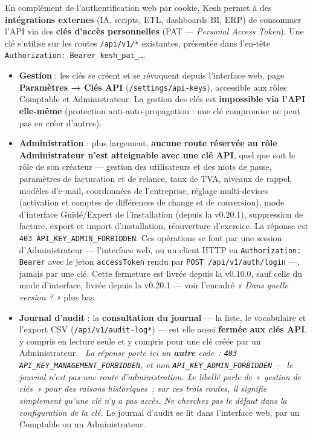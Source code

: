 \documentclass[a4paper,11pt,oneside]{article}
\begin{document}
En complément de l'authentification web par cookie, Kesh permet à des \textbf{intégrations externes} (IA, scripts, ETL, dashboards BI, ERP) de consommer l'API via des \textbf{clés d'accès personnelles} (PAT --- \emph{Personal Access Token}). Une clé s'utilise sur les routes \texttt{/api/v1/*} existantes, présentée dans l'en-tête \texttt{Authorization: Bearer kesh\_pat\_\ldots}.

\begin{itemize}
    \item \textbf{Gestion} : les clés se créent et se révoquent depuis l'interface web, page \textbf{Paramètres → Clés API} (\texttt{/settings/api-keys}), accessible aux rôles Comptable et Administrateur. La gestion des clés est \textbf{impossible via l'API elle-même} (protection anti-auto-propagation : une clé compromise ne peut pas en créer d'autres).
    \item \textbf{Administration} : plus largement, \textbf{aucune route réservée au rôle Administrateur n'est atteignable avec une clé API}, quel que soit le rôle de son créateur --- gestion des utilisateurs et des mots de passe, paramètres de facturation et de relance, taux de TVA, niveaux de rappel, modèles d'e-mail, coordonnées de l'entreprise, réglage multi-devises (activation et comptes de différences de change et de conversion), mode d'interface Guidé/Expert de l'installation (depuis la v0.20.1), suppression de facture, export et import d'installation, réouverture d'exercice. La réponse est \texttt{403 API\_KEY\_ADMIN\_FORBIDDEN}. Ces opérations se font par une session d'Administrateur --- l'interface web, ou un client HTTP en \texttt{Authorization: Bearer} avec le jeton \texttt{accessToken} rendu par \texttt{POST /api/v1/auth/login} ---, jamais par une clé. Cette fermeture est livrée depuis la v0.10.0, sauf celle du mode d'interface, livrée depuis la v0.20.1 --- voir l'encadré \emph{« Dans quelle version ? »} plus bas.
    \item \textbf{Journal d'audit} : la \textbf{consultation du journal} --- la liste, le vocabulaire et l'export CSV (\texttt{/api/v1/audit-log*}) --- est elle aussi \textbf{fermée aux clés API}, y compris en lecture seule et y compris pour une clé créée par un Administrateur. \keshAttention\ \emph{La réponse porte ici un \textbf{autre} code~: \texttt{403 API\_KEY\_MANAGEMENT\_FORBIDDEN}, et non \texttt{API\_KEY\_ADMIN\_FORBIDDEN} --- le journal n'est pas une route d'administration. Le libellé parle de «~gestion de clés~» pour des raisons historiques~; sur ces trois routes, il signifie simplement qu'une clé n'y a pas accès. Ne cherchez pas le défaut dans la configuration de la clé.} Le journal d'audit se lit dans l'interface web, par un Comptable ou un Administrateur.

\end{itemize}
\end{document}
